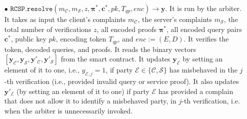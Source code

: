 \begin{definition}[RC-S-P Scheme]
\begin{itemize}

\


\item[$\bullet$] $\mathtt{RCSP}.\mathtt{resolve}(m_{\scriptscriptstyle \mathcal{C}},m_{\scriptscriptstyle \mathcal{S}},z, {\bm{\pi}}^{\scriptscriptstyle *}, {\bm{c}}^{\scriptscriptstyle *},pk, T_{\scriptscriptstyle qp},enc)\rightarrow \bm{y}$. It is run by the arbiter. It takes as input the client's complaints $m_{\scriptscriptstyle \mathcal{C}}$, the server's complaints $m_{\scriptscriptstyle \mathcal{S}}$, the total number of verifications $z$, all encoded proofs $ {\bm{\pi}}^{\scriptscriptstyle *}$, all encoded query pairs $ {\bm{c}}^{\scriptscriptstyle *}$,  public key $pk$, encoding token $T_{\scriptscriptstyle qp}$, and $enc:=(E,D)$. It verifies the token, decoded queries, and proofs.  It reads the  binary vectors $[\bm{y}_{\scriptscriptstyle \mathcal  C}, \bm{y}_{\scriptscriptstyle \mathcal  S},\bm{y}'_{\scriptscriptstyle \mathcal  C}, \bm{y}'_{\scriptscriptstyle \mathcal  S}]$ from the smart contract. It  updates $\bm{y}_{\scriptscriptstyle \mathcal E}$ by setting an element of it to one, i.e., $y_{\scriptscriptstyle \mathcal E,j}=1$, if party $\mathcal{E}\in\{\mathcal{C},\mathcal{S}\}$ has misbehaved in the $j$-th verification (i.e., provided invalid query or service proof). It also updates $\bm{y}'_{\scriptscriptstyle \mathcal E}$ (by setting an element of it to one) if party $\mathcal{E}$ has provided a complain that does not allow it to identify a misbehaved party, in $j$-th verification, i.e. when the arbiter is unnecessarily invoked. 





\end{itemize}
\end{definition}
